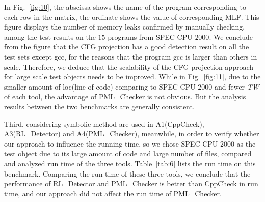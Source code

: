 In Fig.~\ref{fig:10}, the abscissa shows the name of the program corresponding to each row in the matrix, the ordinate shows the value of corresponding MLF. This figure displays the number of memory leaks confirmed by manually checking, among the test results on the $15$ programs from SPEC CPU $2000$. We conclude from the figure that the CFG projection has a good detection result on all the test sets except gcc, for the reasons that the program gcc is larger than others in scale. Therefore, we deduce that the scalability of the CFG projection approach for large scale test objects needs to be improved. While in Fig.~\ref{fig:11}, due to the smaller amount of loc(line of code) comparing to SPEC CPU 2000 and fewer \textit{TW} of each tool, the advantage of PML\_Checker is not obvious. But the analysis results between the two benchmarks are generally consistent.

Third, considering symbolic method are used in A1(CppCheck), A3(RL\_Detector) and A4(PML\_Checker), meanwhile, in order to verify whether our approach to influence the running time, so we chose SPEC CPU 2000 as the test object due to its large amount of code and large number of files, compared and analyzed run time of the three tools.  Table~\ref{tab:6} lists the run time on this benchmark. Comparing the run time of these three tools, we conclude that the performance of RL\_Detector and PML\_Checker is better than CppCheck in run time, and our approach did not affect the run time of PML\_Checker.

